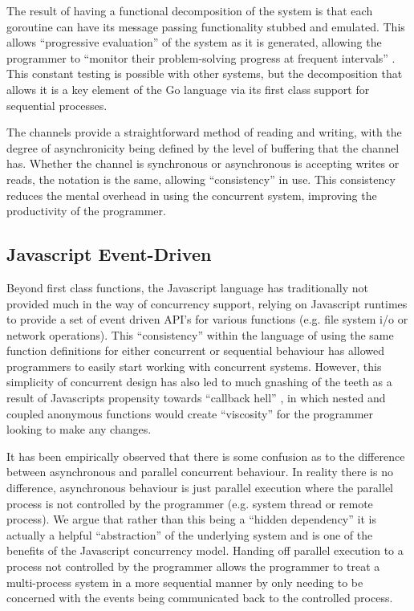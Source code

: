 \documentclass{sig-alternate}
\begin{document}
The result of having a functional decomposition of the system is that each goroutine can have its message passing functionality stubbed and emulated. This allows ``progressive evaluation'' of the system as it is generated, allowing the programmer to ``monitor their problem-solving progress at frequent intervals'' \cite{enpl}. This constant testing is possible with other systems, but the decomposition that allows it is a key element of the Go language via its first class support for sequential processes.

The channels provide a straightforward method of reading and writing, with the degree of asynchronicity being defined by the level of buffering that the channel has. Whether the channel is synchronous or asynchronous is accepting writes or reads, the notation is the same, allowing ``consistency'' in use. This consistency reduces the mental overhead in using the concurrent system, improving the productivity of the programmer.

\subsection{Javascript Event-Driven}
Beyond first class functions, the Javascript language has traditionally not provided much in the way of concurrency support, relying on Javascript runtimes to provide a set of event driven API's for various functions (e.g. file system i/o or network operations). This ``consistency'' within the language of using the same function definitions for either concurrent or sequential behaviour has allowed programmers to easily start working with concurrent systems. However, this simplicity of concurrent design has also led to much gnashing of the teeth as a result of Javascripts propensity towards ``callback hell'' \cite{Edwards:2009:CR:1639950.1640058}, in which nested and coupled anonymous functions would create ``viscosity'' for the programmer looking to make any changes.

It has been empirically observed that there is some confusion as to the difference between asynchronous and parallel concurrent behaviour. In reality there is no difference, asynchronous behaviour is just parallel execution where the parallel process is not controlled by the programmer (e.g. system thread or remote process). We argue that rather than this being a ``hidden dependency'' it is actually a helpful ``abstraction'' of the underlying system and is one of the benefits of the Javascript concurrency model. Handing off parallel execution to a process not controlled by the programmer allows the programmer to treat a multi-process system in a more sequential manner by only needing to be concerned with the events being communicated back to the controlled process.
\end{document}
